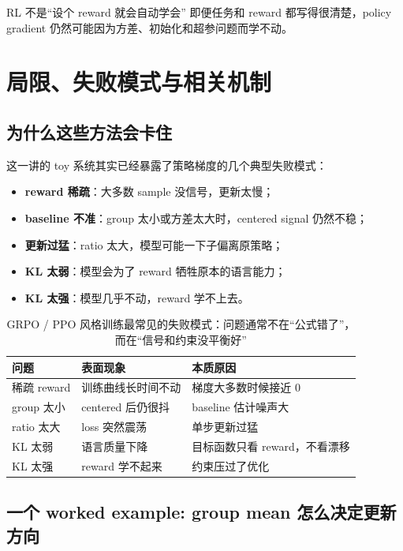 \documentclass[a4paper]{article}
\begin{document}
\begin{warningbox}{RL 不是“设个 reward 就会自动学会”}
即便任务和 reward 都写得很清楚，policy gradient 仍然可能因为方差、初始化和超参问题而学不动。
\end{warningbox}

\section{局限、失败模式与相关机制}

\subsection{为什么这些方法会卡住}

这一讲的 toy 系统其实已经暴露了策略梯度的几个典型失败模式：
\begin{itemize}
    \item \textbf{reward 稀疏}：大多数 sample 没信号，更新太慢；
    \item \textbf{baseline 不准}：group 太小或方差太大时，centered signal 仍然不稳；
    \item \textbf{更新过猛}：ratio 太大，模型可能一下子偏离原策略；
    \item \textbf{KL 太弱}：模型会为了 reward 牺牲原本的语言能力；
    \item \textbf{KL 太强}：模型几乎不动，reward 学不上去。
\end{itemize}

\begin{table}[H]
\centering
\begin{tabular}{@{}p{3.1cm}p{4.5cm}p{5.1cm}@{}}
\toprule
\textbf{问题} & \textbf{表面现象} & \textbf{本质原因} \\
\midrule
稀疏 reward & 训练曲线长时间不动 & 梯度大多数时候接近 0 \\
group 太小 & centered 后仍很抖 & baseline 估计噪声大 \\
ratio 太大 & loss 突然震荡 & 单步更新过猛 \\
KL 太弱 & 语言质量下降 & 目标函数只看 reward，不看漂移 \\
KL 太强 & reward 学不起来 & 约束压过了优化 \\
\bottomrule
\end{tabular}
\caption{GRPO / PPO 风格训练最常见的失败模式：问题通常不在“公式错了”，而在“信号和约束没平衡好”}
\end{table}

\subsection{一个 worked example: group mean 怎么决定更新方向}
\end{document}
